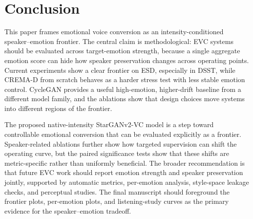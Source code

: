\section{Conclusion}
\label{sec:conclusion}

This paper frames emotional voice conversion as an intensity-conditioned speaker--emotion frontier.
The central claim is methodological: EVC systems should be evaluated across target-emotion strength, because a single aggregate emotion score can hide how speaker preservation changes across operating points.
Current experiments show a clear frontier on ESD, especially in DSST, while CREMA-D from scratch behaves as a harder stress test with less stable emotion control.
CycleGAN provides a useful high-emotion, higher-drift baseline from a different model family, and the ablations show that design choices move systems into different regions of the frontier.

The proposed native-intensity StarGANv2-VC model is a step toward controllable emotional conversion that can be evaluated explicitly as a frontier.
Speaker-related ablations further show how targeted supervision can shift the operating curve, but the paired significance tests show that these shifts are metric-specific rather than uniformly beneficial.
The broader recommendation is that future EVC work should report emotion strength and speaker preservation jointly, supported by automatic metrics, per-emotion analysis, style-space leakage checks, and perceptual studies.
The final manuscript should foreground the frontier plots, per-emotion plots, and listening-study curves as the primary evidence for the speaker--emotion tradeoff.
